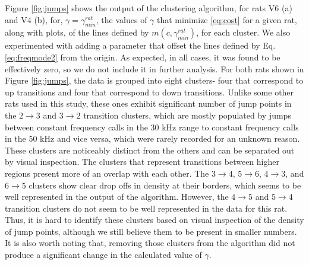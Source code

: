 \documentclass[twocolumn, prl]{revtex4}
\begin{document}
Figure \ref{fig:jumps} shows the output of the clustering algorithm, for rats V6 (a) and V4 (b), for, $\gamma=\gamma_{min}^{rat}$, the values of $\gamma$ that minimize \ref{eq:cost} for a given rat, along with plots, of the lines defined by $m\left(c,\gamma_{min}^{rat}\right)$, for each cluster. We also experimented with adding a parameter that offset the lines defined by Eq. \ref{eq:freqmode2} from the origin. As expected, in all cases, it was found to be effectively zero, so we do not include it in further analysis. For both rats shown in Figure \ref{fig:jumps}, the data is grouped into eight clusters- four that correspond to up transitions and four that correspond to down transitions. Unlike some other rats used in this study, these ones exhibit significant number of jump points in the $2\rightarrow3$ and $3\rightarrow2$ transition clusters, which are mostly populated by jumps between constant frequency calls in the 30 kHz range to constant frequency calls in the 50 kHz and vice versa, which were rarely recorded for an unknown reason. These clusters are noticeably distinct from the others and can be separated out by visual inspection. The clusters that represent transitions between higher regions present more of an overlap with each other. The $3\rightarrow4$, $5\rightarrow6$, $4\rightarrow3$, and $6\rightarrow5$ clusters show clear drop offs in density at their borders, which seems to be well represented in the output of the algorithm. However, the $4\rightarrow5$ and $5\rightarrow4$ transition clusters do not seem to be well represented in the data for this rat. Thus, it is hard to identify these clusters based on visual inspection of the density of jump points, although we still believe them to be present in smaller numbers. It is also worth noting that, removing those clusters from the algorithm did not produce a significant change in the calculated value of $\gamma$. 
\end{document}
